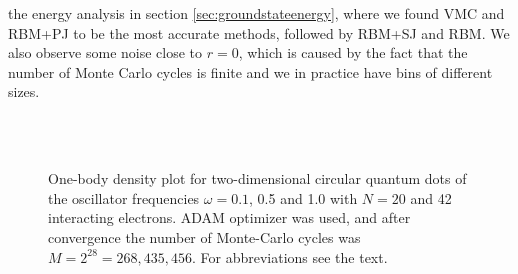 \noindent
the energy analysis in section \ref{sec:groundstateenergy}, where we found VMC and RBM+PJ to be the most accurate methods, followed by RBM+SJ and RBM. We also observe some noise close to $r=0$, which is caused by the fact that the number of Monte Carlo cycles is finite and we in practice have bins of different sizes.

\begin{figure}
	\centering
	\captionsetup[subfigure]{labelformat=empty}
	\hspace{0.1cm}
	\hspace{-0.5cm}
	\\
	
	\hspace{0.1cm}
	\hspace{-0.5cm}
	\\
	
	\hspace{0.1cm}
	\hspace{-0.5cm}
	
	\caption{One-body density plot for two-dimensional circular quantum dots of the oscillator frequencies $\omega=0.1$, 0.5 and 1.0 with $N=20$ and 42 interacting electrons. ADAM optimizer was used, and after convergence the number of Monte-Carlo cycles was $M=2^{28}=268,435,456$. For abbreviations see the text.}
	\label{fig:OB_interaction}
\end{figure}

